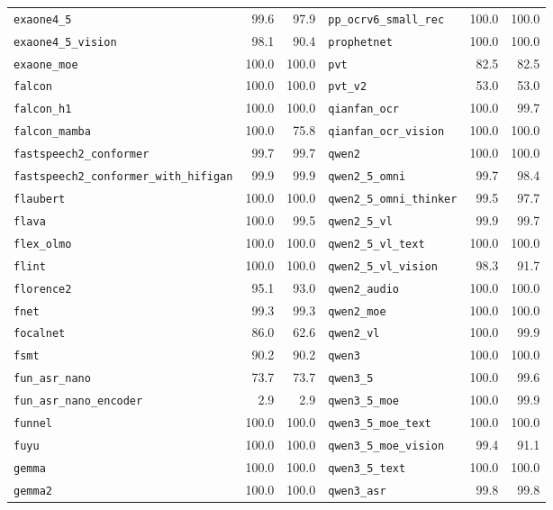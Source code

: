 \begin{longtable}{@{}lrr@{\hspace{24pt}}lrr@{}}
\texttt{exaone4\_5} & 99.6 & 97.9 & \texttt{pp\_ocrv6\_small\_rec} & 100.0 & 100.0 \\
\texttt{exaone4\_5\_vision} & 98.1 & 90.4 & \texttt{prophetnet} & 100.0 & 100.0 \\
\texttt{exaone\_moe} & 100.0 & 100.0 & \texttt{pvt} & 82.5 & 82.5 \\
\texttt{falcon} & 100.0 & 100.0 & \texttt{pvt\_v2} & 53.0 & 53.0 \\
\texttt{falcon\_h1} & 100.0 & 100.0 & \texttt{qianfan\_ocr} & 100.0 & 99.7 \\
\texttt{falcon\_mamba} & 100.0 & 75.8 & \texttt{qianfan\_ocr\_vision} & 100.0 & 100.0 \\
\texttt{fastspeech2\_conformer} & 99.7 & 99.7 & \texttt{qwen2} & 100.0 & 100.0 \\
\texttt{fastspeech2\_conformer\_with\_hifigan} & 99.9 & 99.9 & \texttt{qwen2\_5\_omni} & 99.7 & 98.4 \\
\texttt{flaubert} & 100.0 & 100.0 & \texttt{qwen2\_5\_omni\_thinker} & 99.5 & 97.7 \\
\texttt{flava} & 100.0 & 99.5 & \texttt{qwen2\_5\_vl} & 99.9 & 99.7 \\
\texttt{flex\_olmo} & 100.0 & 100.0 & \texttt{qwen2\_5\_vl\_text} & 100.0 & 100.0 \\
\texttt{flint} & 100.0 & 100.0 & \texttt{qwen2\_5\_vl\_vision} & 98.3 & 91.7 \\
\texttt{florence2} & 95.1 & 93.0 & \texttt{qwen2\_audio} & 100.0 & 100.0 \\
\texttt{fnet} & 99.3 & 99.3 & \texttt{qwen2\_moe} & 100.0 & 100.0 \\
\texttt{focalnet} & 86.0 & 62.6 & \texttt{qwen2\_vl} & 100.0 & 99.9 \\
\texttt{fsmt} & 90.2 & 90.2 & \texttt{qwen3} & 100.0 & 100.0 \\
\texttt{fun\_asr\_nano} & 73.7 & 73.7 & \texttt{qwen3\_5} & 100.0 & 99.6 \\
\texttt{fun\_asr\_nano\_encoder} & 2.9 & 2.9 & \texttt{qwen3\_5\_moe} & 100.0 & 99.9 \\
\texttt{funnel} & 100.0 & 100.0 & \texttt{qwen3\_5\_moe\_text} & 100.0 & 100.0 \\
\texttt{fuyu} & 100.0 & 100.0 & \texttt{qwen3\_5\_moe\_vision} & 99.4 & 91.1 \\
\texttt{gemma} & 100.0 & 100.0 & \texttt{qwen3\_5\_text} & 100.0 & 100.0 \\
\texttt{gemma2} & 100.0 & 100.0 & \texttt{qwen3\_asr} & 99.8 & 99.8 \\

\end{longtable}
